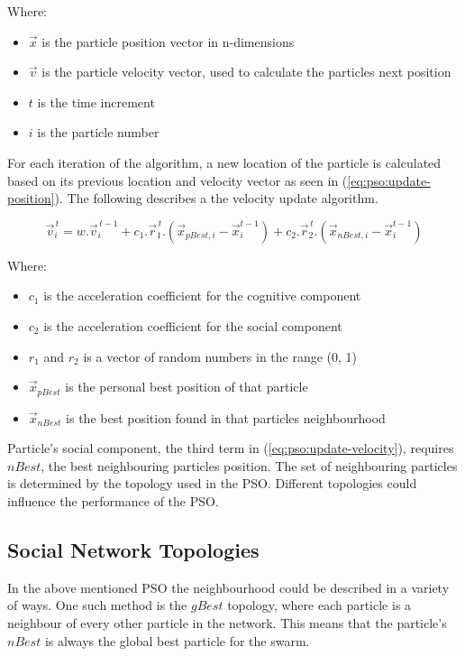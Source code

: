 \documentclass[conference]{IEEEtran}
\begin{document}
\noindent Where:
\begin{itemize}
	\item $ \vec{x} $ is the particle position vector in n-dimensions
	\item $ \vec{v} $ is the particle velocity vector, used to calculate the particles next position
	\item $t$ is the time increment
	\item $i$ is the particle number
\end{itemize}
\vspace{5mm}
\noindent For each iteration of the algorithm, a new location of the particle is calculated based on its previous location and velocity vector as seen in (\ref{eq:pso:update-position}). The following describes a the velocity update algorithm.

\begin{equation} \label{eq:pso:update-velocity}
\vec{v}_{i}^{\,t} = w . \vec{v}_{i}^{\,t-1} + c_1 . \vec{r}_{1}^{\,t} . (\vec{x}_{pBest, i} - \vec{x}_{i}^{t-1}) + c_2 . \vec{r}_{2}^{\,t} . (\vec{x}_{nBest, i} - \vec{x}_{i}^{t-1})
\end{equation}

\noindent Where:
\begin{itemize}
	\item $c_1$ is the acceleration coefficient for the cognitive component
	\item $c_2$ is the acceleration coefficient for the social component
	\item $r_1$ and $r_2$ is a vector of random numbers in the range (0, 1)
	\item $\vec{x}_{pBest}$ is the personal best position of that particle
	\item $\vec{x}_{nBest}$ is the best position found in that particles neighbourhood
\end{itemize}
\vspace{5mm}
\noindent Particle's social component, the third term in (\ref{eq:pso:update-velocity}), requires $ nBest $, the best neighbouring particles position. The set of neighbouring particles is determined by the topology used in the \ac{PSO}. Different topologies could influence the performance of the \ac{PSO}.

    \subsection{Social Network Topologies}
    
    In the above mentioned \ac{PSO} the neighbourhood could be described in a variety of ways. One such method is the $ gBest $ topology, where each particle is a neighbour of every other particle in the network. This means that the particle's $ nBest $ is always the global best particle for the swarm. 
    
\end{document}
